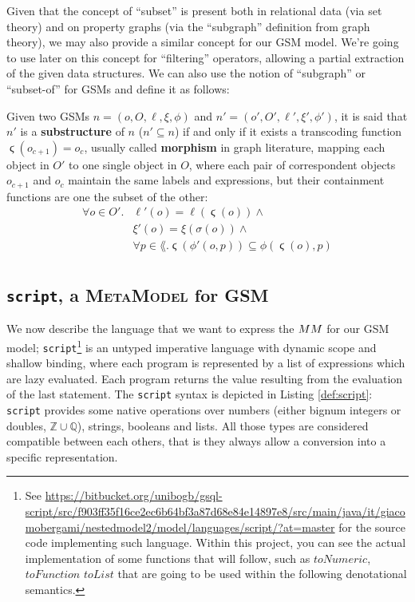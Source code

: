 Given that the concept of ``subset'' is present both in relational data (via set theory) and on property graphs (via the ``subgraph'' definition from graph theory), we may also provide a similar concept for our GSM model. We're going to use later on this concept for ``filtering'' operators, allowing a partial extraction of the given data structures. We can also use the notion of ``subgraph'' or ``subset-of'' for GSMs and define it as follows:
\begin{definition}[Substructure]
Given two GSMs $n=(o,O,\ell,\xi,\phi)$ and $n'=(o',O',\ell',\xi',\phi')$, it is said that $n'$ is a \textbf{substructure} of $n$ ($n'\subseteq n$) if and only if it
 exists a transcoding function $\stigma(o_{c+1})=o_c$, usually called \textbf{morphism} in graph literature, mapping each object in $O'$ to one single object in $O$, where each pair of correspondent objects $o_{c+1}$ and $o_c$ maintain the same labels and expressions, but their containment functions are one the subset of the other:
\[\begin{split}
\forall o\in O'. &\ell'(o) = \ell(\stigma(o))\wedge\\
&\xi'(o) = \xi(\sigma(o))\wedge\\
&\forall p\in\lang. \stigma(\phi'(o,p))\subseteq \phi(\stigma(o),p)\\
\end{split}\]
\end{definition}

\subsection{\texttt{script}, a \textsc{MetaModel} for GSM}\label{sec:scriptEll}
We now describe the language that we want to express the $\metamodel$ for our GSM model; \texttt{script}\footnote{See \url{https://bitbucket.org/unibogb/gsql-script/src/f903ff35f16ce2ec6b64bf3a87d68e84e14897e8/src/main/java/it/giacomobergami/nestedmodel2/model/languages/script/?at=master} for the source code implementing such language. Within this project, you can see the actual implementation of some functions that will follow, such as $toNumeric$, $toFunction$ $toList$ that are going to be used within the following denotational semantics.} is an untyped imperative language with dynamic scope and shallow binding, where each program is represented by a list of expressions which are lazy evaluated. Each program returns the value  resulting from the evaluation of the last statement. The \texttt{script} syntax is depicted in Listing \vref{def:script}: \texttt{script} provides some native operations over numbers (either bignum integers or doubles, $\mathbb{Z}\cup\mathbb{Q}$), strings, booleans and lists. All those types are considered compatible between each others, that is they always allow a conversion into a specific representation.



